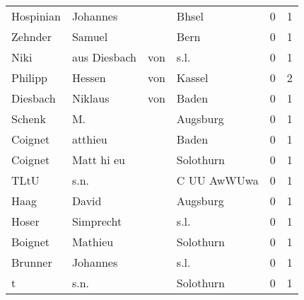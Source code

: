 \begin{tabular}{llllrr}
                Hospinian &                           Johannes &             &                                       Bhsel &          0 &         1 \\
                  Zehnder &                             Samuel &             &                                        Bern &          0 &         1 \\
                     Niki &                      aus  Diesbach &         von &                                        s.l. &          0 &         1 \\
                  Philipp &                             Hessen &         von &                                      Kassel &          0 &         2 \\
                 Diesbach &                            Niklaus &         von &                                       Baden &          0 &         1 \\
                   Schenk &                                 M. &             &                                    Augsburg &          0 &         1 \\
                  Coignet &                            atthieu &             &                                       Baden &          0 &         1 \\
                  Coignet &                         Matt hi eu &             &                                   Solothurn &          0 &         1 \\
                     TLtU &                               s.n. &             &                                 C UU AwWUwa &          0 &         1 \\
                     Haag &                              David &             &                                    Augsburg &          0 &         1 \\
                    Hoser &                          Simprecht &             &                                        s.l. &          0 &         1 \\
                  Boignet &                            Mathieu &             &                                   Solothurn &          0 &         1 \\
                  Brunner &                           Johannes &             &                                        s.l. &          0 &         1 \\
                        t &                               s.n. &             &                                   Solothurn &          0 &         1 \\

\end{tabular}
